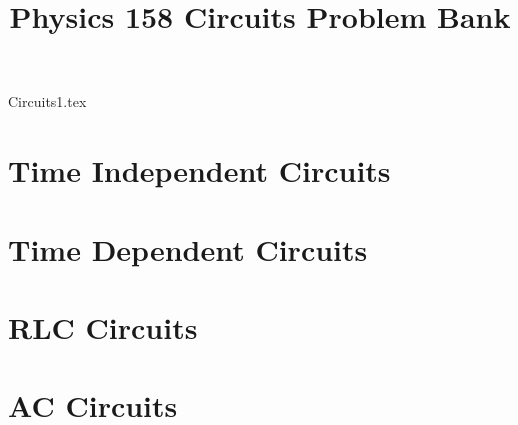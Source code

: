\documentclass[11pt, fleqn]{article}
\title{Physics 158 Circuits Problem Bank}
\author{}
\date{}
\begin{document}
\allowdisplaybreaks

\maketitle

{Circuits1.tex}

\section*{Time Independent Circuits}

\section*{Time Dependent Circuits}

\section*{RLC Circuits}

\section*{AC Circuits}
\end{document}
